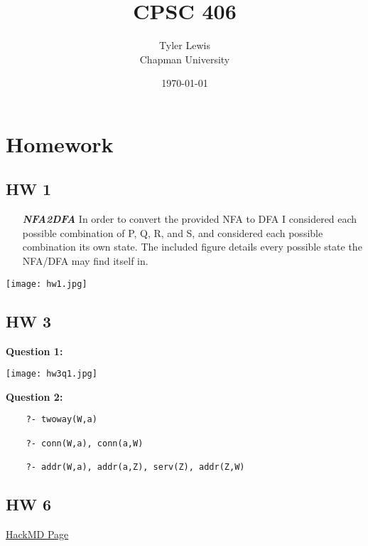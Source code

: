 \documentclass{article}
\title{CPSC 406}
\author{Tyler Lewis  \\ Chapman University}
\date{\today}
\theoremstyle{theorem}
\theoremstyle{definition}
\theoremstyle{remark}
\begin{document}
\maketitle

\tableofcontents

\section{Homework}\label{intro}
\subsection{HW 1}

\begin{minipage}{0.4\textwidth}
\begin{itemize}
\item[\textbf{\emph{NFA2DFA}}] In order to convert the provided NFA to DFA I considered each possible combination of P, Q, R, and S, and considered each possible combination its own state. The included figure details every possible state the NFA/DFA may find itself in.
\end{itemize}
\end{minipage}%
%
\begin{minipage}{0.4\textwidth}
\begin{center}
    \texttt{[image: hw1.jpg]}
    \label{img:g}
\end{center}
\end{minipage}

\subsection{HW 3}

{\bf Question 1:}

    \texttt{[image: hw3q1.jpg]}
    

{\bf Question 2:}
\begin{verbatim}
    ?- twoway(W,a)
    
    ?- conn(W,a), conn(a,W)
    
    ?- addr(W,a), addr(a,Z), serv(Z), addr(Z,W)
\end{verbatim}

\subsection{HW 6}
\href{https://hackmd.io/@alexhkurz/ByaOUajy2}{HackMD Page}
\end{document}
